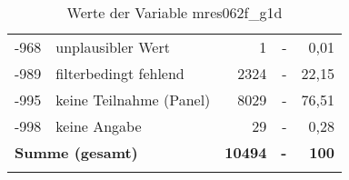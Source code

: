 \begin{longtable}{Xlrrr}
       -968 & unplausibler Wert & 1 & - & 0,01 \\

       -989 & filterbedingt fehlend & 2324 & - & 22,15 \\

       -995 & keine Teilnahme (Panel) & 8029 & - & 76,51 \\

       -998 & keine Angabe & 29 & - & 0,28 \\

     \midrule
     \multicolumn{2}{l}{\textbf{Summe (gesamt)}} & \textbf{10494} & \textbf{-} & \textbf{100} \\
     \bottomrule
     \caption{Werte der Variable mres062f\_g1d}
     \end{longtable}
     
